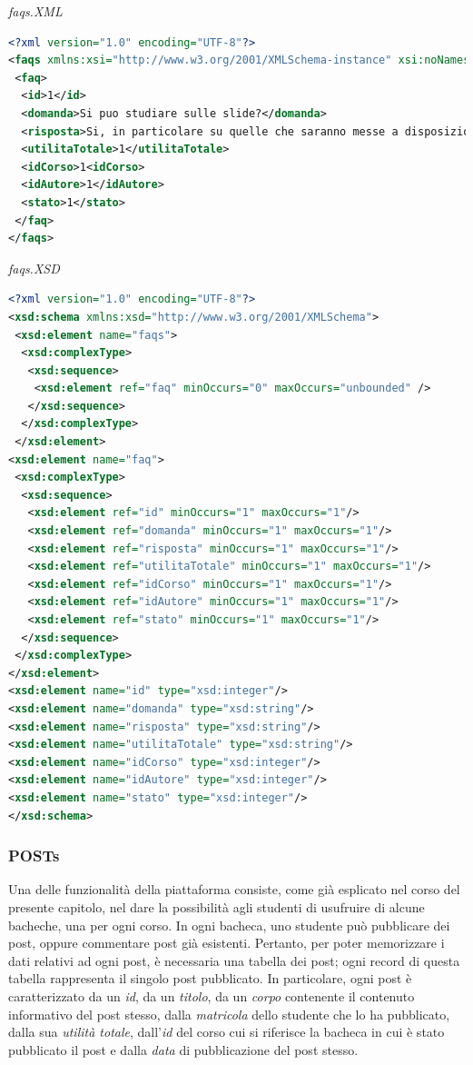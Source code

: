\documentclass [a4paper,11pt]{book}
\begin{document}
\emph{faqs.XML}

\label{sec:faqs}

\begin{lstlisting}[language=XML]
<?xml version="1.0" encoding="UTF-8"?>
<faqs xmlns:xsi="http://www.w3.org/2001/XMLSchema-instance" xsi:noNamespaceSchemaLocation="faqs.xsd">
 <faq>
  <id>1</id>
  <domanda>Si puo studiare sulle slide?</domanda>
  <risposta>Si, in particolare su quelle che saranno messe a disposizione durante il corso</risposta>
  <utilitaTotale>1</utilitaTotale>
  <idCorso>1<idCorso>
  <idAutore>1</idAutore>
  <stato>1</stato>
 </faq>
</faqs>
\end{lstlisting}

\medskip

\emph{faqs.XSD}

\begin{lstlisting}[language=XML]
<?xml version="1.0" encoding="UTF-8"?>
<xsd:schema xmlns:xsd="http://www.w3.org/2001/XMLSchema">
 <xsd:element name="faqs">
  <xsd:complexType>
   <xsd:sequence>
    <xsd:element ref="faq" minOccurs="0" maxOccurs="unbounded" />
   </xsd:sequence>
  </xsd:complexType>
 </xsd:element>
<xsd:element name="faq">
 <xsd:complexType>
  <xsd:sequence>
   <xsd:element ref="id" minOccurs="1" maxOccurs="1"/>
   <xsd:element ref="domanda" minOccurs="1" maxOccurs="1"/>
   <xsd:element ref="risposta" minOccurs="1" maxOccurs="1"/>
   <xsd:element ref="utilitaTotale" minOccurs="1" maxOccurs="1"/>
   <xsd:element ref="idCorso" minOccurs="1" maxOccurs="1"/>
   <xsd:element ref="idAutore" minOccurs="1" maxOccurs="1"/>
   <xsd:element ref="stato" minOccurs="1" maxOccurs="1"/>
  </xsd:sequence>
 </xsd:complexType>
</xsd:element>
<xsd:element name="id" type="xsd:integer"/>
<xsd:element name="domanda" type="xsd:string"/>
<xsd:element name="risposta" type="xsd:string"/>
<xsd:element name="utilitaTotale" type="xsd:string"/>
<xsd:element name="idCorso" type="xsd:integer"/>
<xsd:element name="idAutore" type="xsd:integer"/>
<xsd:element name="stato" type="xsd:integer"/>
</xsd:schema>
\end{lstlisting}

\medskip

\subsubsection{POSTs}

Una delle funzionalità della piattaforma consiste, come già esplicato nel corso del presente capitolo, nel dare la possibilità agli studenti di usufruire di alcune bacheche, una per ogni corso. In ogni bacheca, uno studente può pubblicare dei post, oppure commentare post già esistenti. Pertanto, per poter memorizzare i dati relativi ad ogni post, è necessaria una tabella dei post; ogni record di questa tabella rappresenta il singolo post pubblicato. In particolare, ogni post è caratterizzato da un \emph{id}, da un \emph{titolo}, da un \emph{corpo} contenente il contenuto informativo del post stesso, dalla \emph{matricola} dello studente che lo ha pubblicato, dalla sua \emph{utilità totale}, dall'\emph{id} del corso cui si riferisce la bacheca in cui è stato pubblicato il post e dalla \emph{data} di pubblicazione del post stesso.
\end{document}
